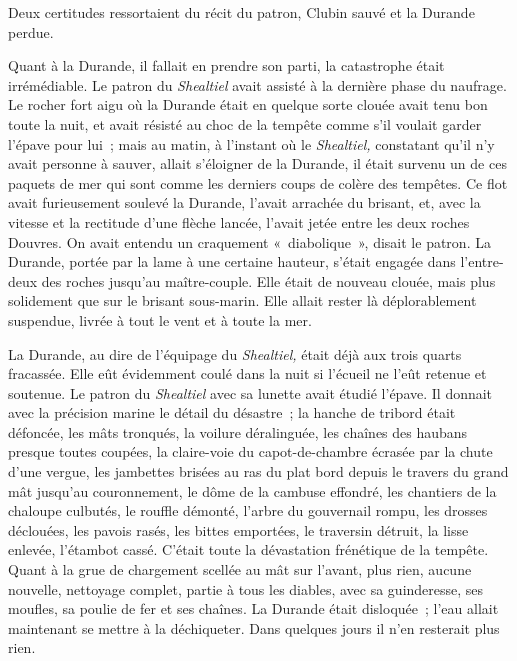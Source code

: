 \documentclass[french,twoside]{book} %
\begin{document}
Deux certitudes ressortaient du récit du patron, Clubin sauvé et la Durande perdue.\par
Quant à la Durande, il fallait en prendre son parti, la catastrophe était irrémédiable. Le patron du \emph{Shealtiel} avait assisté à la dernière phase du naufrage. Le rocher fort aigu où la Durande était en quelque sorte clouée avait tenu bon toute la nuit, et avait résisté au choc de la tempête comme s’il voulait garder l’épave pour lui ; mais au matin, à l’instant où le \emph{Shealtiel, }constatant qu’il n’y avait personne à sauver, allait s’éloigner de la Durande, il était survenu un de ces paquets de mer qui sont comme les derniers coups de colère des tempêtes. Ce flot avait furieusement soulevé la Durande, l’avait arrachée du brisant, et, avec la vitesse et la rectitude d’une flèche lancée, l’avait jetée entre les deux roches Douvres. On avait entendu un craquement « diabolique », disait le patron. La Durande, portée par la lame à une certaine hauteur, s’était engagée dans l’entre-deux des roches jusqu’au maître-couple. Elle était de nouveau clouée, mais plus  solidement que sur le brisant sous-marin. Elle allait rester là déplorablement suspendue, livrée à tout le vent et à toute la mer.\par
La Durande, au dire de l’équipage du \emph{Shealtiel,} était déjà aux trois quarts fracassée. Elle eût évidemment coulé dans la nuit si l’écueil ne l’eût retenue et soutenue. Le patron du \emph{Shealtiel} avec sa lunette avait étudié l’épave. Il donnait avec la précision marine le détail du désastre ; la hanche de tribord était défoncée, les mâts tronqués, la voilure déralinguée, les chaînes des haubans presque toutes coupées, la claire-voie du capot-de-chambre écrasée par la chute d’une vergue, les jambettes brisées au ras du plat bord depuis le travers du grand mât jusqu’au couronnement, le dôme de la cambuse effondré, les chantiers de la chaloupe culbutés, le rouffle démonté, l’arbre du gouvernail rompu, les drosses déclouées, les pavois rasés, les bittes emportées, le traversin détruit, la lisse enlevée, l’étambot cassé. C’était toute la dévastation frénétique de la tempête. Quant à la grue de chargement scellée au mât sur l’avant, plus rien, aucune nouvelle, nettoyage complet, partie à tous les diables, avec sa guinderesse, ses moufles, sa poulie de fer et ses chaînes. La Durande était disloquée ; l’eau allait maintenant se mettre à la déchiqueter. Dans quelques jours il n’en resterait plus rien.\par
\end{document}
